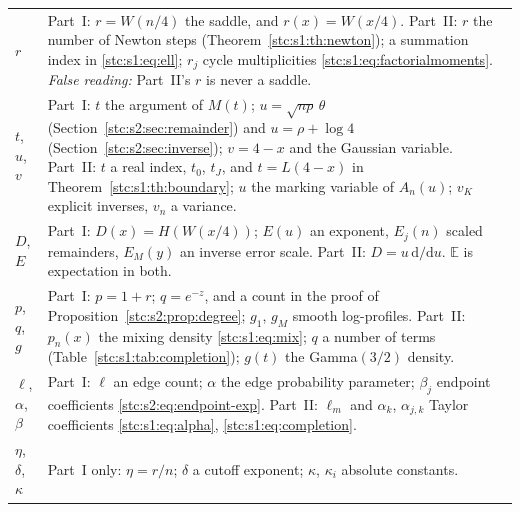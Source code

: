 \documentclass[11pt,letterpaper]{article}
\numberwithin{equation}{section}
\theoremstyle{remark}\newtheorem{remark}[theorem]{Remark}
\newcommand{\E}{\mathbb E}
\begin{document}
\begin{longtable}{@{}>{\raggedright\arraybackslash}p{} >{\raggedright\arraybackslash}p{}@{}}
$r$ & Part~I: $r=W(n/4)$ the saddle, and $r(x)=W(x/4)$. Part~II: $r$ the number of Newton steps (Theorem~\ref{stc:s1:th:newton}); a summation index in \eqref{stc:s1:eq:ell}; $r_j$ cycle multiplicities \eqref{stc:s1:eq:factorialmoments}. \emph{False reading:} Part~II's $r$ is never a saddle.\\
$t$, $u$, $v$ & Part~I: $t$ the argument of $M(t)$; $u=\sqrt{np}\,\theta$ (Section~\ref{stc:s2:sec:remainder}) and $u=\rho+\log4$ (Section~\ref{stc:s2:sec:inverse}); $v=4-x$ and the Gaussian variable. Part~II: $t$ a real index, $t_0$, $t_J$, and $t=L(4-x)$ in Theorem~\ref{stc:s1:th:boundary}; $u$ the marking variable of $A_n(u)$; $v_K$ explicit inverses, $v_n$ a variance.\\
$D$, $E$ & Part~I: $D(x)=H(W(x/4))$; $E(u)$ an exponent, $E_j(n)$ scaled remainders, $E_M(y)$ an inverse error scale. Part~II: $D=u\,\mathrm d/\mathrm du$. $\E$ is expectation in both.\\
$p$, $q$, $g$ & Part~I: $p=1+r$; $q=e^{-z}$, and a count in the proof of Proposition~\ref{stc:s2:prop:degree}; $g_1$, $g_M$ smooth log-profiles. Part~II: $p_n(x)$ the mixing density \eqref{stc:s1:eq:mix}; $q$ a number of terms (Table~\ref{stc:s1:tab:completion}); $g(t)$ the Gamma$(3/2)$ density.\\
$\ell$, $\alpha$, $\beta$ & Part~I: $\ell$ an edge count; $\alpha$ the edge probability parameter; $\beta_j$ endpoint coefficients \eqref{stc:s2:eq:endpoint-exp}. Part~II: $\ell_m$ and $\alpha_k$, $\alpha_{j,k}$ Taylor coefficients \eqref{stc:s1:eq:alpha}, \eqref{stc:s1:eq:completion}.\\
$\eta$, $\delta$, $\kappa$ & Part~I only: $\eta=r/n$; $\delta$ a cutoff exponent; $\kappa$, $\kappa_i$ absolute constants.\\
\bottomrule
\end{longtable}
\addtocounter{table}{-1}%
\endgroup
\end{document}
